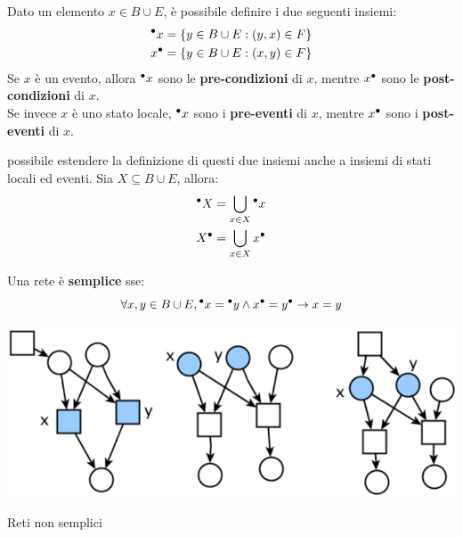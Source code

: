 \begin{defn}
    Dato un elemento $x \in B \cup E$, è possibile definire i due seguenti insiemi:
    \begin{align*}
        {^\bullet}x &= \left\{y \in B \cup E : (y, x) \in F\right\}\\
        x^\bullet &= \left\{y \in B \cup E : (x, y) \in F\right\}
    \end{align*}
    Se $x$ è un evento, allora ${^\bullet}x$ sono le \textbf{pre-condizioni} di $x$, mentre $x^\bullet$ sono le \textbf{post-condizioni} di $x$.\\
    Se invece $x$ è uno stato locale, ${^\bullet}x$ sono i \textbf{pre-eventi} di $x$, mentre $x^\bullet$ sono i \textbf{post-eventi} di $x$.
    
    \upperAccE possibile estendere la definizione di questi due insiemi anche a insiemi di stati locali ed eventi. Sia $X \subseteq B \cup E$, allora:
    \begin{align*}
        {^\bullet}X &= \bigcup\limits_{x \in X} {^\bullet}x\\
        X^\bullet &= \bigcup\limits_{x \in X} x^\bullet
    \end{align*}
\end{defn}

\begin{defn}
    Una rete è \textbf{semplice} sse:
    \[
        \forall x, y \in B \cup E, {^\bullet}x = {^\bullet}y \land x^\bullet = y^\bullet \rightarrow x = y
    \]
    \begin{marginfigure}[-5cm]
        \includegraphics[width=1\linewidth]{img/reti_non_semplici.png}
        \caption{Reti non semplici}
        \label{fig:reti_non_semplici}
    \end{marginfigure}
\end{defn}

